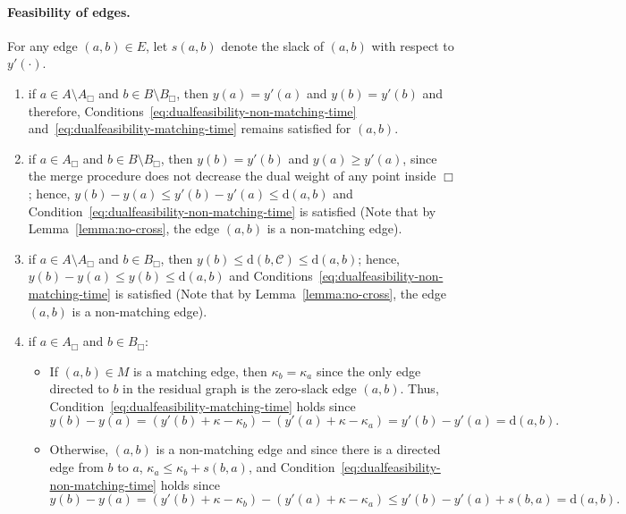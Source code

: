\documentclass[11pt,onecolumn]{article}
\def\mcC{{\mathcal{C}}}
\newcommand{\cell}{\Box}
\newcommand{\distance}[2]{\mathrm{d}(#1, #2)}
\newcommand\myparagraph[1]{\paragraph{#1}}
\begin{document}
    \myparagraph{Feasibility of edges.} For any edge $(a,b)\in E$, let $s(a,b)$ denote the slack of $(a,b)$ with respect to $y'(\cdot)$. 
    \begin{enumerate}
        \item if $a\in A\setminus A_\cell$ and $b\in B\setminus B_\cell$, then $y(a)=y'(a)$ and $y(b)=y'(b)$ and therefore, Conditions~\eqref{eq:dualfeasibility-non-matching-time} and~\eqref{eq:dualfeasibility-matching-time} remains satisfied for $(a,b)$.
        
        \item if $a\in A_\cell$ and $b\in B\setminus B_\cell$, then $y(b)=y'(b)$ and $y(a)\ge y'(a)$, since the merge procedure does not decrease the dual weight of any point inside $\cell$; hence, $y(b)-y(a)\le y'(b)-y'(a)\le \distance{a}{b}$ and Condition~\eqref{eq:dualfeasibility-non-matching-time} is satisfied (Note that by Lemma~\ref{lemma:no-cross}, the edge $(a,b)$ is a non-matching edge).

        \item if $a\in A\setminus A_\cell$ and $b\in B_\cell$, then $y(b)\le \distance{b}{\mcC}\le \distance{a}{b}$; hence, $y(b)-y(a)\le y(b)\le \distance{a}{b}$ and Conditions~\eqref{eq:dualfeasibility-non-matching-time} is satisfied (Note that by Lemma~\ref{lemma:no-cross}, the edge $(a,b)$ is a non-matching edge).

        \item if $a\in  A_\cell$ and $b\in B_\cell$: 
        \begin{itemize}
            \item If $(a,b)\in M$ is a matching edge, then $\kappa_b = \kappa_a$ since the only edge directed to $b$ in the residual graph is the zero-slack edge $(a,b)$. Thus, Condition~\eqref{eq:dualfeasibility-matching-time} holds since
            \begin{equation*}
            y(b) - y(a) = (y'(b)+\kappa-\kappa_b) - (y'(a)+\kappa-\kappa_a) = y'(b)-y'(a) = \distance{a}{b}.
            \end{equation*}
            \item Otherwise, $(a,b)$ is a non-matching edge and since there is a directed edge from $b$ to $a$, $\kappa_a\le \kappa_b + s(b,a)$, and Condition~\eqref{eq:dualfeasibility-non-matching-time} holds since
            \begin{equation}\label{eq:local-hung-1}
                y(b)-y(a) = (y'(b)+\kappa-\kappa_b) - (y'(a)+\kappa-\kappa_a) \le y'(b)-y'(a) + s(b,a) = \distance{a}{b}.
            \end{equation}
        \end{itemize}
    \end{enumerate}
\end{document}
